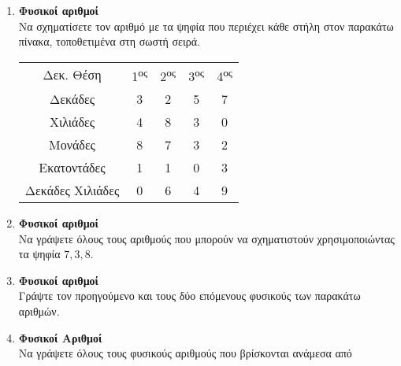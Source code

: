 \documentclass[twoside,nofonts,internet]{askhseis}
\newcommand{\tss}[1]{\textsuperscript{#1}}
\begin{document}
\begin{enumerate}[itemsep=5mm]
\item \textbf{Φυσικοί αριθμοί}\\
Να σχηματίσετε τον αριθμό με τα ψηφία που περιέχει κάθε στήλη στον παρακάτω πίνακα, τοποθετιμένα στη σωστή σειρά.
\begin{center}
\begin{tabular}{c|c|c|c|c} 
\hline \rule[-1.5ex]{0pt}{5ex} Δεκ. Θέση & 1\tss{ος} & 2\tss{ος} & 3\tss{ος} & 4\tss{ος} \\ 
\hhline{=====} \rule[-1.5ex]{0pt}{5ex} Δεκάδες & 3 & 2 & 5 & 7 \\ 
\rule[-1.5ex]{0pt}{5ex} Χιλιάδες & 4 & 8 & 3 & 0 \\ 
\rule[-1.5ex]{0pt}{5ex} Μονάδες & 8 & 7 & 3 & 2 \\ 
\rule[-1.5ex]{0pt}{5ex} Εκατοντάδες & 1 & 1 & 0 & 3 \\ 
\rule[-1.5ex]{0pt}{5ex} Δεκάδες Χιλιάδες & 0 & 6 & 4 & 9 \\ 
\hline 
\end{tabular} 
\end{center}
\item \textbf{Φυσικοί αριθμοί}\\
Να γράψετε όλους τους αριθμούς που μπορούν να σχηματιστούν χρησιμοποιώντας τα ψηφία $ 7,3,8 $.
\item \textbf{Φυσικοί αριθμοί}\\
Γράψτε τον προηγούμενο και τους δύο επόμενους φυσικούς των παρακάτω αριθμών.
\begin{multicols}{3}
\end{multicols}
\item \textbf{Φυσικοί Αριθμοί}\\
Να γράψετε όλους τους φυσικούς αριθμούς που βρίσκονται ανάμεσα από

\end{enumerate}
\end{document}
